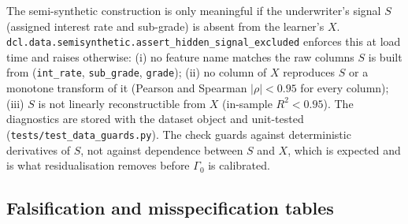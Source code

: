 The semi-synthetic construction is only meaningful if the underwriter's signal
$S$ (assigned interest rate and sub-grade) is absent from the learner's $X$.
\texttt{dcl.data.semisynthetic.assert\_hidden\_signal\_excluded} enforces this
at load time and raises otherwise: (i) no feature name matches the raw columns
$S$ is built from (\texttt{int\_rate}, \texttt{sub\_grade}, \texttt{grade});
(ii) no column of $X$ reproduces $S$ or a monotone transform of it (Pearson
and Spearman $|\rho|<0.95$ for every column); (iii) $S$ is not linearly
reconstructible from $X$ (in-sample $R^2<0.95$). The diagnostics are stored
with the dataset object and unit-tested (\texttt{tests/test\_data\_guards.py}).
The check guards against deterministic derivatives of $S$, not against
dependence between $S$ and $X$, which is expected and is what residualisation
removes before $\Gamma_0$ is calibrated.

\subsection{Falsification and misspecification tables}
\label{app:falsify}

